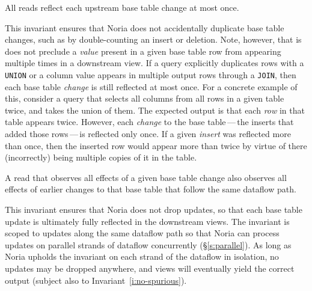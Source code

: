 \begin{invariant}
  \label{i:no-spurious}
  All reads reflect each upstream base table change at most once.
\end{invariant}

This invariant ensures that Noria does not accidentally duplicate base table
changes, such as by double-counting an insert or deletion. Note, however, that
is does not preclude a \emph{value} present in a given base table row from
appearing multiple times in a downstream view. If a query explicitly duplicates
rows with a \texttt{UNION} or a column value appears in multiple output rows
through a \texttt{JOIN}, then each base table \emph{change} is still reflected
at most once. For a concrete example of this, consider a query that selects all
columns from all rows in a given table twice, and takes the union of them. The
expected output is that each \emph{row} in that table appears twice. However,
each \emph{change} to the base table\,---\,the inserts that added those
rows\,---\,is reflected only once. If a given \emph{insert} was reflected more
than once, then the inserted row would appear more than twice by virtue of there
(incorrectly) being multiple copies of it in the table.

\begin{invariant}
  \label{i:prefix-consistency}
  A read that observes all effects of a given base table change also observes
  all effects of earlier changes to that base table that follow the same
  dataflow path.
\end{invariant}

This invariant ensures that Noria does not drop updates, so that each base table
update is ultimately fully reflected in the downstream views. The invariant is
scoped to updates along the same dataflow path so that Noria can process updates
on parallel strands of dataflow concurrently (\S\ref{s:parallel}). As long as
Noria upholds the invariant on each strand of the dataflow in isolation, no
updates may be dropped anywhere, and views will eventually yield the correct
output (subject also to Invariant~\ref{i:no-spurious}).

